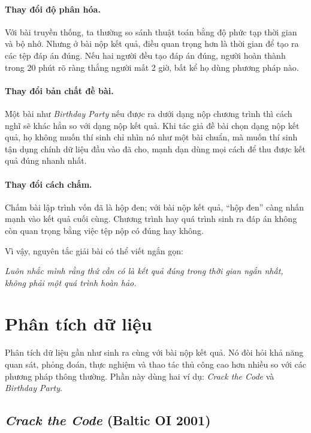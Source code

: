\documentclass[11pt]{article}
\begin{document}
\paragraph{Thay đổi độ phân hóa.}
Với bài truyền thống, ta thường so sánh thuật toán bằng độ phức tạp thời gian
và bộ nhớ. Nhưng ở bài nộp kết quả, điều quan trọng hơn là thời gian để tạo
ra các tệp đáp án đúng. Nếu hai người đều tạo đáp án đúng, người hoàn thành
trong 20 phút rõ ràng thắng người mất 2 giờ, bất kể họ dùng phương pháp nào.

\paragraph{Thay đổi bản chất đề bài.}
Một bài như \textit{Birthday Party} nếu được ra dưới dạng nộp chương trình
thì cách nghĩ sẽ khác hẳn so với dạng nộp kết quả. Khi tác giả đề bài chọn
dạng nộp kết quả, họ không muốn thí sinh chỉ nhìn nó như một bài chuẩn, mà
muốn thí sinh tận dụng chính dữ liệu đầu vào đã cho, mạnh dạn dùng mọi cách
để thu được kết quả đúng nhanh nhất.

\paragraph{Thay đổi cách chấm.}
Chấm bài lập trình vốn đã là hộp đen; với bài nộp kết quả, ``hộp đen'' càng
nhấn mạnh vào kết quả cuối cùng. Chương trình hay quá trình sinh ra đáp án
không còn quan trọng bằng việc tệp nộp có đúng hay không.

Vì vậy, nguyên tắc giải bài có thể viết ngắn gọn:

\begin{center}
\textit{Luôn nhắc mình rằng thứ cần có là kết quả đúng trong thời gian ngắn
nhất, không phải một quá trình hoàn hảo.}
\end{center}

\section{Phân tích dữ liệu}

Phân tích dữ liệu gần như sinh ra cùng với bài nộp kết quả. Nó đòi hỏi khả
năng quan sát, phỏng đoán, thực nghiệm và thao tác thủ công cao hơn nhiều so
với các phương pháp thông thường. Phần này dùng hai ví dụ:
\textit{Crack the Code} và \textit{Birthday Party}.

\subsection{\textit{Crack the Code} (Baltic OI 2001)}
\end{document}

